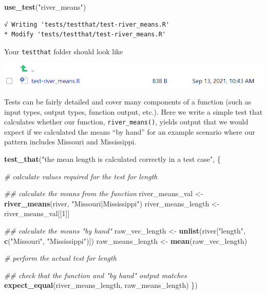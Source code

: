 \documentclass[
]{book}
\newenvironment{Shaded}{\begin{snugshade}}{\end{snugshade}}
\newcommand{\CommentTok}[1]{\textcolor[rgb]{0.56,0.35,0.01}{\textit{#1}}}
\newcommand{\DecValTok}[1]{\textcolor[rgb]{0.00,0.00,0.81}{#1}}
\newcommand{\KeywordTok}[1]{\textcolor[rgb]{0.13,0.29,0.53}{\textbf{#1}}}
\newcommand{\NormalTok}[1]{#1}
\newcommand{\StringTok}[1]{\textcolor[rgb]{0.31,0.60,0.02}{#1}}
\begin{document}
\begin{Shaded}
\begin{Highlighting}[]
\KeywordTok{use_test}\NormalTok{(}\StringTok{"river_means"}\NormalTok{)}
\end{Highlighting}
\end{Shaded}

\begin{verbatim}
√ Writing 'tests/testthat/test-river_means.R'
* Modify 'tests/testthat/test-river_means.R'
\end{verbatim}

Your \texttt{testthat} folder should look like

\includegraphics[width=1\linewidth]{images/newrpack_files5}

Tests can be fairly detailed and cover many components of a function (such as input types, output types, function output, etc.). Here we write a simple test that calculates whether our function, \texttt{river\_means()}, yields output that we would expect if we calculated the means ``by hand'' for an example scenario where our pattern includes Missouri and Mississippi.

\begin{Shaded}
\begin{Highlighting}[]
\KeywordTok{test_that}\NormalTok{(}\StringTok{"the mean length is calculated correctly in a test case"}\NormalTok{, \{}
  
  \CommentTok{# calculate values required for the test for length}

  \CommentTok{## calculate the means from the function}
\NormalTok{  river_means_val <-}\StringTok{ }\KeywordTok{river_means}\NormalTok{(river, }\StringTok{"Missouri|Mississippi"}\NormalTok{)}
\NormalTok{  river_means_length <-}\StringTok{ }\NormalTok{river_means_val[[}\DecValTok{1}\NormalTok{]]}

  \CommentTok{## calculate the means "by hand"}
\NormalTok{  raw_vec_length <-}\StringTok{ }\KeywordTok{unlist}\NormalTok{(river[}\StringTok{"length"}\NormalTok{, }\KeywordTok{c}\NormalTok{(}\StringTok{"Missouri"}\NormalTok{, }\StringTok{"Mississippi"}\NormalTok{)])}
\NormalTok{  raw_means_length <-}\StringTok{ }\KeywordTok{mean}\NormalTok{(raw_vec_length)}
  
  \CommentTok{# perform the actual test for length}

  \CommentTok{## check that the function and "by hand" output matches}
  \KeywordTok{expect_equal}\NormalTok{(river_means_length, raw_means_length)}
\NormalTok{\})}
\end{Highlighting}
\end{Shaded}
\end{document}
